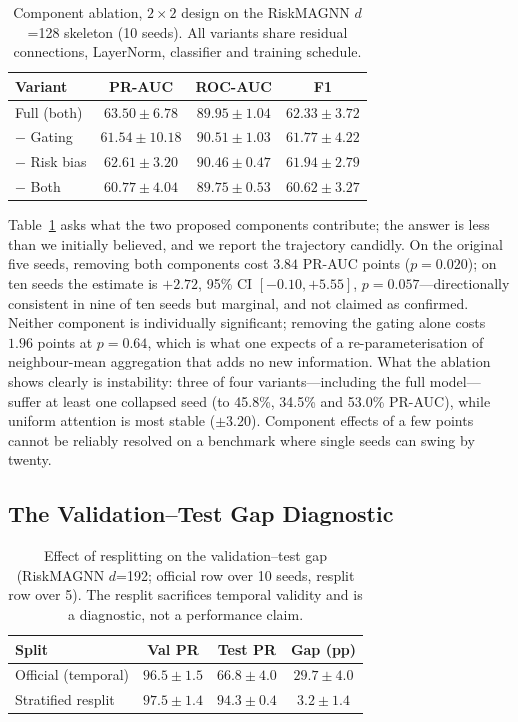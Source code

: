 \documentclass[conference]{IEEEtran}
\begin{document}
\begin{table}[t]
\caption{Component ablation, $2\times2$ design on the RiskMAGNN $d$=128
skeleton (10 seeds). All variants share residual connections, LayerNorm,
classifier and training schedule.}
\label{tab:ablation}
\centering
\footnotesize
\setlength{\tabcolsep}{2.5pt}
\begin{tabular}{lccc}
\toprule
\textbf{Variant} & \textbf{PR-AUC} & \textbf{ROC-AUC} & \textbf{F1} \\
\midrule
Full (both)     & $\mathbf{63.50 \pm 6.78}$ & $89.95 \pm 1.04$ & $\mathbf{62.33 \pm 3.72}$ \\
$-$ Gating      & $61.54 \pm 10.18$ & $\mathbf{90.51 \pm 1.03}$ & $61.77 \pm 4.22$ \\
$-$ Risk bias   & $62.61 \pm 3.20$ & $90.46 \pm 0.47$ & $61.94 \pm 2.79$ \\
$-$ Both        & $60.77 \pm 4.04$ & $89.75 \pm 0.53$ & $60.62 \pm 3.27$ \\
\bottomrule
\end{tabular}
\end{table}

Table~\ref{tab:ablation} asks what the two proposed components contribute;
the answer is less than we initially believed, and we report the trajectory
candidly. On the original five seeds, removing both components cost $3.84$
PR-AUC points ($p=0.020$); on ten seeds the estimate is $+2.72$, 95\% CI
$[-0.10, +5.55]$, $p=0.057$---directionally consistent in nine of ten seeds
but marginal, and not claimed as confirmed. Neither component is individually
significant; removing the gating alone costs $1.96$ points at $p=0.64$, which
is what one expects of a re-parameterisation of neighbour-mean aggregation
that adds no new information. What the ablation shows clearly is instability:
three of four variants---including the full model---suffer at least one
collapsed seed (to 45.8\%, 34.5\% and 53.0\% PR-AUC), while uniform attention
is most stable ($\pm 3.20$). Component effects of a few points cannot be
reliably resolved on a benchmark where single seeds can swing by twenty.

\subsection{The Validation--Test Gap Diagnostic}
\label{sec:resplit}

\begin{table}[t]
\caption{Effect of resplitting on the validation--test gap (RiskMAGNN
$d$=192; official row over 10 seeds, resplit row over 5). The resplit
sacrifices temporal validity and is a diagnostic, not a performance claim.}
\label{tab:resplit}
\centering
\footnotesize
\setlength{\tabcolsep}{2.5pt}
\begin{tabular}{lccc}
\toprule
\textbf{Split} & \textbf{Val PR} & \textbf{Test PR} & \textbf{Gap (pp)} \\
\midrule
Official (temporal)   & $96.5 \pm 1.5$ & $66.8 \pm 4.0$ & $29.7 \pm 4.0$ \\
Stratified resplit    & $97.5 \pm 1.4$ & $94.3 \pm 0.4$ & $3.2 \pm 1.4$ \\
\bottomrule
\end{tabular}
\end{table}
\end{document}
